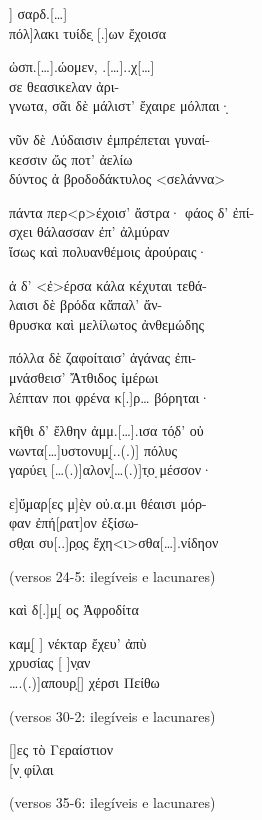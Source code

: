 \begin{gkverse}
] σαρδ.[\ldots{}]\\
     πόλ]λακι τυίδε̣ [.]ων ἔχοισα

ὠσπ.[\ldots{}].ώομεν, .[\ldots{}]..χ[\ldots{}]\\
    σε \dagger{}θεασικελαν ἀρι-\\
      γνωτα\dagger{}, σᾶι δὲ μάλιστ’ ἔχαιρε μόλπαι·̣

νῦν δὲ Λύδαισιν ἐμπρέπεται γυναί-\\
    κεσσιν ὤς ποτ’ ἀελίω\\
      δύντος ἀ βροδοδάκτυλος <σελάννα>

πάντα περ<ρ>έχοισ’ ἄστρα· φάος δ’ ἐπί-\\
    σχει θάλασσαν ἐπ’ ἀλμύραν\\
      ἴσως καὶ πολυανθέμοις ἀρούραις·

ἀ δ’ <ἐ>έρσα κάλα κέχυται τεθά-\\
    λαισι δὲ βρόδα κἄπαλ’ ἄν-\\
      θρυσκα καὶ μελίλωτος ἀνθεμώδης 

πόλλα δὲ ζαφοίταισ’ ἀγάνας ἐπι-\\
    μνάσθεισ’ Ἄτθιδος ἰμέρωι\\
      λέπταν ποι φρένα κ[.]ρ\ldots{} βόρηται·

κῆθι δ’ ἔλθην ἀμμ.[\ldots{}].ισα τό̣δ’ οὐ\\
    νωντα[\ldots{}]υστονυμ[̣..(.)] πόλυς\\
      γαρύει̣ [\ldots{}(.)]αλον[̣\ldots{}(.)]τ̣ο ̣μέσσον·

ε]ὔ̣μαρ[ες μ]ὲ̣ν οὐ.α.μι θέαισι μόρ-\\
    φαν ἐπή[ρατ]ον ἐξίσω-\\
      σθ̣αι συ[..]ρ̣ο̣ς ἔχη<ι>σθα[\ldots{}].νίδηον

\textnormal{(versos 24-5: ilegíveis e lacunares)}

      καὶ δ[.]μ{[}̣	\qquad		{]}ος Ἀφροδίτα

καμ[̣		\qquad	] νέκταρ ἔχευ’ ἀπὺ\\
    χρυσίας [		       ]ν̣αν\\
      \ldots{}.(.)]απουρ̣[\qquad		] χέρσι Πείθω

\textnormal{(versos 30-2: ilegíveis e lacunares)}

[\qquad			]ες τὸ Γεραίστιον\\
    {[}\qquad			   {]}ν ̣φίλαι

\textnormal{(versos 35-6: ilegíveis e lacunares)}
\end{gkverse}


